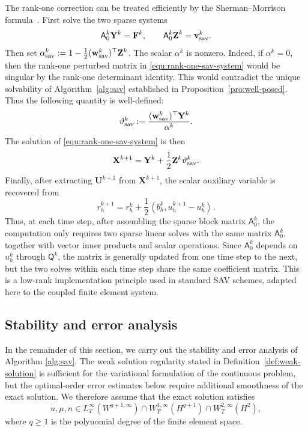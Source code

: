 \documentclass[11pt, reqno]{amsart}
\theoremstyle{definition}
\numberwithin{equation}{section}
\newcommand{\inpro}[2]{\left\langle#1,#2\right\rangle}
\begin{document}
{The rank-one correction can be treated efficiently by the Sherman--Morrison
formula~\cite{SheMor50}. First solve the two sparse systems
\[
\mathsf A_0^k\mathbf Y^k=\mathbf F^k,
\qquad
\mathsf A_0^k\mathbf Z^k=\mathbf v_{\rm sav}^k.
\]
Then set $\alpha_{\rm sav}^k
:=
1-\frac12(\mathbf w_{\rm sav}^k)^\top\mathbf Z^k$.
The scalar $\alpha^k$ is nonzero. Indeed, if $\alpha^k=0$, then the rank-one
perturbed matrix in \eqref{equ:rank-one-sav-system} would be singular by the
rank-one determinant identity. This would contradict the unique solvability of
Algorithm~\ref{alg:sav} established in Proposition~\ref{pro:well-posed}.
Thus the following quantity is well-defined:
\[
\vartheta_{\rm sav}^k
:=
\frac{(\mathbf w_{\rm sav}^k)^\top\mathbf Y^k}{\alpha^k}.
\]
The solution of \eqref{equ:rank-one-sav-system} is then
\[
\mathbf X^{k+1}
=
\mathbf Y^k
+
\frac12\mathbf Z^k \vartheta_{\rm sav}^k.
\]
Finally, after extracting $\mathbf U^{k+1}$ from $\mathbf X^{k+1}$, the scalar
auxiliary variable is recovered from
\[
r_h^{k+1}
=
r_h^k
+
\frac12\inpro{b_h^k}{u_h^{k+1}-u_h^k}.
\]
Thus, at each time step, after assembling the sparse block matrix $\mathsf A_0^k$, the computation only requires two sparse linear solves with the same matrix $\mathsf A_0^k$, together with vector inner products and scalar operations. Since $\mathsf A_0^k$ depends on $u_h^k$ through $\mathsf Q^k$, the matrix is generally updated from one time step to the next, but the two solves within each time step share the same coefficient matrix.
This is a low-rank implementation principle used in standard SAV schemes, adapted here to the coupled finite element system.
}




\subsection{Stability and error analysis}

In the remainder of this section, we carry out the stability and error analysis of Algorithm \ref{alg:sav}. The weak solution regularity stated in Definition~\ref{def:weak-solution} is sufficient for the variational formulation of the continuous problem, but the optimal-order error estimates below require additional smoothness of the exact solution. We therefore assume that the exact solution satisfies
\begin{equation}\label{equ:reg u euler}
	u,\mu,n \in L^\infty_T(W^{q+1,\infty}) \cap W^{1,\infty}_T(H^{q+1}) \cap W^{2,\infty}_T(H^2),
\end{equation}
where $q\geq 1$ is the polynomial degree of the finite element space.
\end{document}
